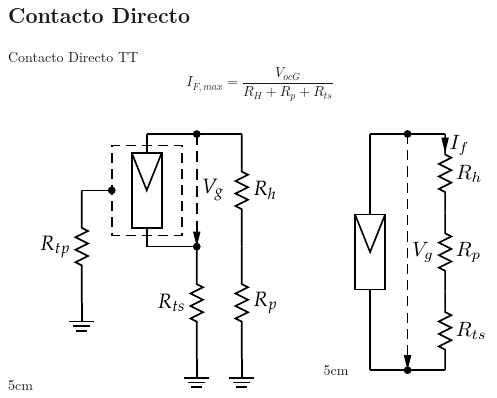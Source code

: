 \documentclass[xcolor={usenames,svgnames,dvipsnames}]{beamer}
\begin{document}
\subsection{Contacto Directo}
\label{sec-2-2}

\begin{frame}[label=sec-2-2-1]{Contacto Directo TT}
$$I_{F,max}=\frac{V_{ocG}}{R_{H}+R_{p}+R_{ts}}$$

\begin{columns}
\begin{column}{5cm\textwidth}
\includegraphics[height=0.5\textheight]{../figs/ContactoDirectoTT.pdf}
\end{column}

\begin{column}{5cm\textwidth}
\includegraphics[height=0.5\textheight]{../figs/ContactoDirectoTT_simple.pdf}
\end{column}
\end{columns}
\end{frame}
\end{document}
